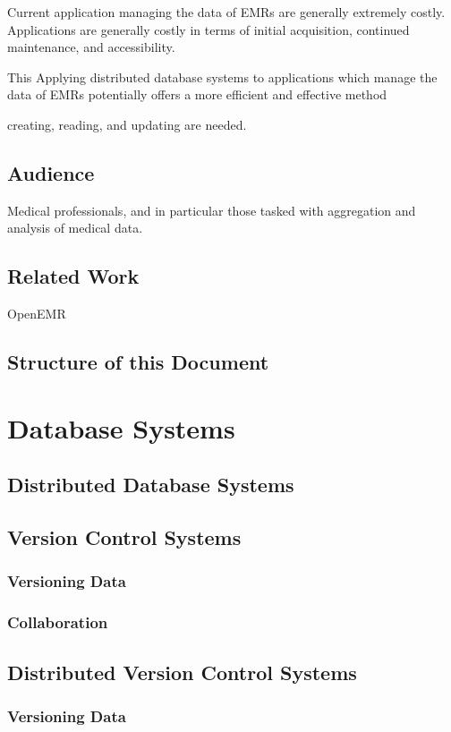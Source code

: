 \documentclass{acm_proc_article-sp}
\begin{document}
Current application managing the data of EMRs are generally extremely costly.  
Applications are generally costly in terms of initial acquisition, continued maintenance, 
and accessibility.

This Applying distributed database systems to applications which manage the data of EMRs
potentially offers a more efficient and effective method 

creating, reading, and updating are needed.


\subsection{Audience}
Medical professionals, and in particular those tasked with aggregation and analysis of medical data.

\subsection{Related Work}
OpenEMR


\subsection{Structure of this Document}

\section{Database Systems}

\subsection{Distributed Database Systems}
\subsection{Version Control Systems}
\subsubsection{Versioning Data}
\subsubsection{Collaboration}
\subsection{Distributed Version Control Systems}
\subsubsection{Versioning Data}
\end{document}
